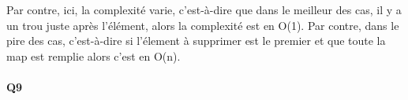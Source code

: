 \documentclass[a4paper]{article}
\begin{document}
Par contre, ici, la complexité varie, c'est-à-dire que dans le meilleur des cas, il y a un trou juste après l'élément, alors la complexité est en O(1). Par contre, dans le pire des cas, c'est-à-dire si l'élement à supprimer est le premier et que toute la map est remplie alors c'est en O(n).

\paragraph{Q9}
\end{document}
